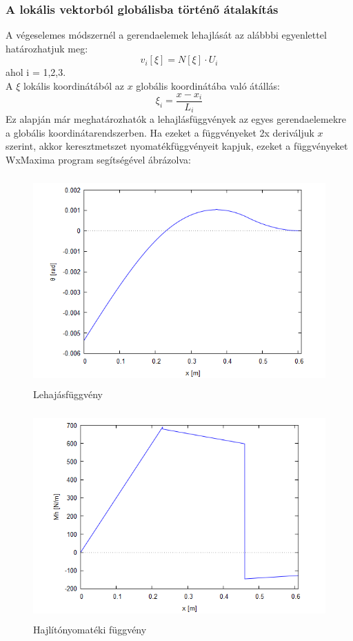 \documentclass{article}
\begin{document}
	\subsubsection{A lokális vektorból globálisba történő átalakítás}	
		A végeselemes módszernél a gerendaelemek lehajlását az alábbbi egyenlettel határozhatjuk meg:
		\begin{equation}
			v_i[\xi]=N[\xi]\cdot U_i
		\end{equation}
		ahol i = 1,2,3.\\[10pt]		
		A $\xi$ lokális koordinátából az $x$ globális koordinátába való átállás:
		\begin{equation}
			\xi_i=\frac{x-x_i}{L_{i}}
		\end{equation}
		Ez alapján már meghatározhatók a lehajlásfüggvények az egyes gerendaelemekre a globális koordinátarendszerben.
		Ha ezeket a függvényeket 2x deriváljuk $x$ szerint, akkor keresztmetszet nyomatékfüggvényeit kapjuk, ezeket a függvényeket WxMaxima program segítségével ábrázolva:
		\begin{figure}[h!]
			\begin{center}
				\includegraphics[height=8cm]{images/vem_lehaj}
			\end{center}
			\caption{Lehajásfüggvény}
			\label{vem_lehaj}
		\end{figure}
		\begin{figure}[h!]
			\begin{center}
				\includegraphics[height=8cm]{images/vem_nyomatek}
			\end{center}
			\caption{Hajlítónyomatéki függvény}
			\label{vem_nyom}
		\end{figure}\\[10pt]
\end{document}
